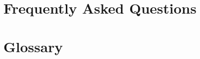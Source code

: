 \documentclass[11pt]{article}
\begin{document}
\section{Frequently Asked Questions}
\label{faq}
\section{Glossary}
\label{glos}
\end{document}

